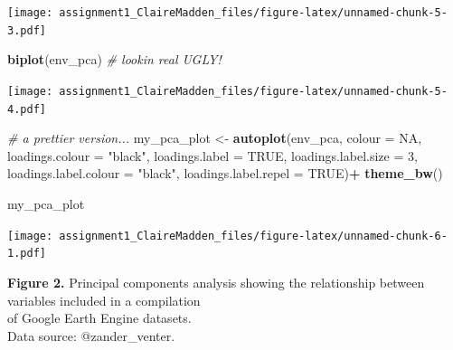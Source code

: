 \documentclass[]{article}
\newenvironment{Shaded}{\begin{snugshade}}{\end{snugshade}}
\newcommand{\KeywordTok}[1]{\textcolor[rgb]{0.13,0.29,0.53}{\textbf{#1}}}
\newcommand{\DataTypeTok}[1]{\textcolor[rgb]{0.13,0.29,0.53}{#1}}
\newcommand{\DecValTok}[1]{\textcolor[rgb]{0.00,0.00,0.81}{#1}}
\newcommand{\StringTok}[1]{\textcolor[rgb]{0.31,0.60,0.02}{#1}}
\newcommand{\CommentTok}[1]{\textcolor[rgb]{0.56,0.35,0.01}{\textit{#1}}}
\newcommand{\OtherTok}[1]{\textcolor[rgb]{0.56,0.35,0.01}{#1}}
\newcommand{\OperatorTok}[1]{\textcolor[rgb]{0.81,0.36,0.00}{\textbf{#1}}}
\newcommand{\NormalTok}[1]{#1}
\begin{document}
\begin{Shaded}
\end{Shaded}

\texttt{[image: assignment1\_ClaireMadden\_files/figure-latex/unnamed-chunk-5-3.pdf]}

\begin{Shaded}
\begin{Highlighting}[]
\KeywordTok{biplot}\NormalTok{(env_pca) }\CommentTok{# lookin real UGLY! }
\end{Highlighting}
\end{Shaded}

\texttt{[image: assignment1\_ClaireMadden\_files/figure-latex/unnamed-chunk-5-4.pdf]}

\begin{Shaded}
\begin{Highlighting}[]
\CommentTok{# a prettier version...}
\NormalTok{my_pca_plot <-}\StringTok{ }\KeywordTok{autoplot}\NormalTok{(env_pca,}
                        \DataTypeTok{colour =} \OtherTok{NA}\NormalTok{,}
                        \DataTypeTok{loadings.colour =} \StringTok{"black"}\NormalTok{,}
                        \DataTypeTok{loadings.label =} \OtherTok{TRUE}\NormalTok{,}
                        \DataTypeTok{loadings.label.size =} \DecValTok{3}\NormalTok{,}
                        \DataTypeTok{loadings.label.colour =} \StringTok{"black"}\NormalTok{,}
                        \DataTypeTok{loadings.label.repel =} \OtherTok{TRUE}\NormalTok{)}\OperatorTok{+}
\StringTok{  }\KeywordTok{theme_bw}\NormalTok{()}

\NormalTok{my_pca_plot}
\end{Highlighting}
\end{Shaded}

\texttt{[image: assignment1\_ClaireMadden\_files/figure-latex/unnamed-chunk-6-1.pdf]}

\textbf{Figure 2.} Principal components analysis showing the
relationship between variables included in a compilation\\
of Google Earth Engine datasets.\\
Data source: @zander\_venter.
\end{document}
